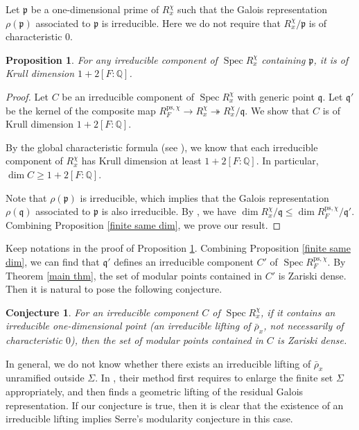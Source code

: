 \documentclass[a4paper, 12pt]{amsart}
\newtheorem{prop}[thm]{Proposition}
\newtheorem{conj}[thm]{Conjecture} \theoremstyle{definition}
\DeclareMathOperator{\Spec}{Spec}
\def\ps{\mathrm{ps}}
\newcommand{\Q}{\mathbb{Q}}
\newcommand{\kq}{\mathfrak{q}}
\newcommand{\kp}{\mathfrak{p}}
\begin{document}
     Let $\kp$ be a one-dimensional prime of $R_x^{\chi}$ such that the Galois representation $\rho(\kp)$ associated to $\kp$ is irreducible. Here we do not require
     that $R_x^{\chi}/\kp$ is of characteristic $0$.
     
     \begin{prop}\label{dim of x}
     	For any irreducible component of $\Spec R_x^{\chi}$ containing $\kp$, it is of Krull dimension $1+2[F:\Q]$.
     \end{prop}
    
    \begin{proof}
    	Let $C$ be an irreducible component of $\Spec R_x^{\chi}$ with generic point $\kq$. Let $\kq'$ be the kernel of the composite map $R_{F}^{\ps, \chi} \to R_x^{\chi} \twoheadrightarrow R_x^{\chi}/\kq$. We show that $C$
        is of Krull dimension	$1+2[F:\Q]$.
    	
    	By the global characteristic formula (see \cite[Proposition 3.1.3]{Zhang:2024ab}), we know that each irreducible component of $ R_x^{\chi}$ has Krull dimension at least $1+2[F:\Q]$. In particular, $\dim C \ge 1+2[F:\Q]$.
    	
    	Note that $\rho(\kp)$ is irreducible, which implies that the Galois representation $\rho(\kq)$ associated to $\kp$ is also irreducible. By \cite[Corollary 2.3.6 (2)]{pan2022fontaine}, we have $\dim R_x^{\chi}/\kq \le \dim R_{F}^{\ps, \chi}/\kq' $. Combining Proposition \ref{finite same dim}, we prove our result.
    \end{proof}
    
    Keep notations in the proof of Proposition \ref{dim of x}. Combining Proposition \ref{finite same dim}, we can find that $\kq'$ defines an irreducible component $C'$ of $\Spec R_{F}^{\ps, \chi}$. By Theorem \ref{main thm}, the set of modular points contained in $C'$ is Zariski dense. Then it is natural to pose the following conjecture.
    
    \begin{conj}\label{conj for x}
    	For an irreducible component $C$ of $\Spec R_x^{\chi}$, if it contains an irreducible one-dimensional point (an irreducible lifting of $ \bar{\rho}_x$, not necessarily of characteristic $0$), then the set of modular points contained in $C$ is Zariski dense.
    \end{conj}
    
    In general, we do not know whether there exists an irreducible lifting of $\bar{\rho}_x$ unramified outside $\Sigma$. In \cite{Fakhruddin2022}, their method first requires to enlarge the finite set $\Sigma$ appropriately, and then finds a geometric lifting of the residual Galois representation. If our conjecture is true, then it is clear that the existence of an irreducible lifting implies Serre's modularity conjecture in this case.
    
\end{document}
